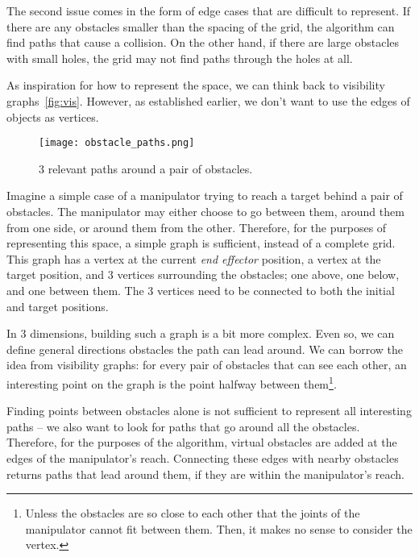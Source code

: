 The second issue comes in the form of edge cases that are difficult to represent. If there are any obstacles smaller than the spacing of the grid, the algorithm can find paths that cause a collision. On the other hand, if there are large obstacles with small holes, the grid may not  find paths through the holes at all.

As inspiration for how to represent the space, we can think back to visibility graphs~\ref{fig:vis}. However, as established earlier, we don't want to use the edges of objects as vertices.

\begin{wrapfigure}{r}{0.4\textwidth}
  \centering
  \texttt{[image: obstacle\_paths.png]}
  \caption{3 relevant paths around a pair of obstacles.}
\end{wrapfigure}

Imagine a simple case of a manipulator trying to reach a target behind a pair of obstacles. The manipulator may either choose to go between them, around them from one side, or around them from the other. Therefore, for the purposes of representing this space, a simple graph is sufficient, instead of a complete grid. This graph has a vertex at the current \textit{end effector} position, a vertex at the target position, and 3 vertices surrounding the obstacles; one above, one below, and one between them. The 3 vertices need to be connected to both the initial and target positions.

In 3 dimensions, building such a graph is a bit more complex. Even so, we can define general directions obstacles the path can lead around. We can borrow the idea from visibility graphs: for every pair of obstacles that can see each other, an interesting point on the graph is the point halfway between them\footnote{Unless the obstacles are so close to each other that the joints of the manipulator cannot fit between them. Then, it makes no sense to consider the vertex.}.

Finding points between obstacles alone is not sufficient to represent all interesting paths -- we also want to look for paths that go around all the obstacles. Therefore, for the purposes of the algorithm, virtual obstacles are added at the edges of the manipulator's reach. Connecting these edges with nearby obstacles returns paths that lead around them, if they are within the manipulator's reach.

